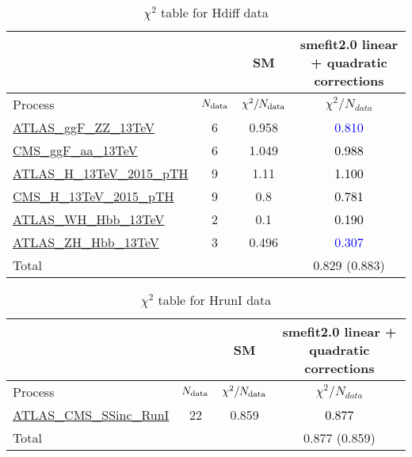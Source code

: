 \documentclass{article}
\begin{document}
\begin{table}[H]
\centering
\begin{tabular}{|l|c|c|c|}
\hline
 \multicolumn{2}{|c|}{} & SM& smefit2.0 linear + quadratic corrections\\ \hline
Process & $N_{\rm data}$ & $\chi^ 2/N_{\rm data}$& $\chi^ 2/N_{data}$\\ \hline
\href{https://arxiv.org/abs/1909.02845}{ATLAS_ggF_ZZ_13TeV} & 6 & 0.958 & \textcolor{blue}                            {0.810} \\ \hline
\href{https://inspirehep.net/literature/1725274}{CMS_ggF_aa_13TeV} & 6 & 1.049 & \textcolor{black}                            {0.988} \\ \hline
\href{https://inspirehep.net/literature/1743896}{ATLAS_H_13TeV_2015_pTH} & 9 & 1.11 & \textcolor{black}                            {1.100} \\ \hline
\href{https://arxiv.org/abs/1812.06504}{CMS_H_13TeV_2015_pTH} & 9 & 0.8 & \textcolor{black}                            {0.781} \\ \hline
\href{https://arxiv.org/abs/1903.04618}{ATLAS_WH_Hbb_13TeV} & 2 & 0.1 & \textcolor{black}                            {0.190} \\ \hline
\href{https://arxiv.org/abs/1903.04618}{ATLAS_ZH_Hbb_13TeV} & 3 & 0.496 & \textcolor{blue}                            {0.307} \\ \hline
\hline Total & &  & 0.829 (0.883) \\ \hline
\end{tabular}
\caption{$\chi^2$ table for Hdiff data}
\end{table}
\begin{table}[H]
\centering
\begin{tabular}{|l|c|c|c|}
\hline
 \multicolumn{2}{|c|}{} & SM& smefit2.0 linear + quadratic corrections\\ \hline
Process & $N_{\rm data}$ & $\chi^ 2/N_{\rm data}$& $\chi^ 2/N_{data}$\\ \hline
\href{https://arxiv.org/abs/1606.02266}{ATLAS_CMS_SSinc_RunI} & 22 & 0.859 & \textcolor{black}                            {0.877} \\ \hline
\hline Total & &  & 0.877 (0.859) \\ \hline
\end{tabular}
\caption{$\chi^2$ table for HrunI data}
\end{table}
\end{document}
